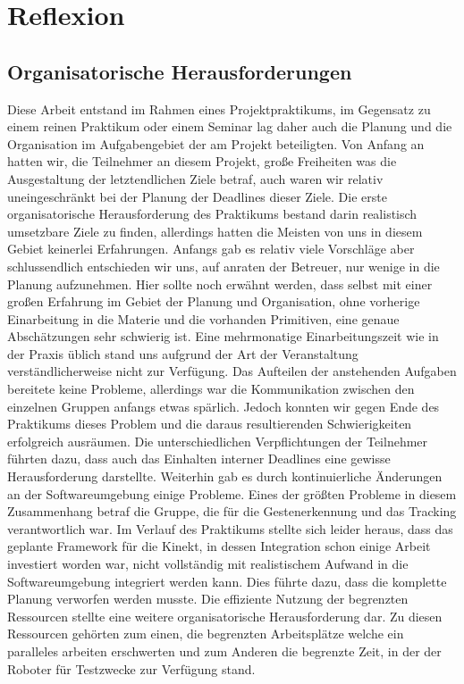 \section{Reflexion}
\authorsection{\editorandreas}
\subsection{Organisatorische Herausforderungen}
Diese Arbeit entstand im Rahmen eines Projektpraktikums, im Gegensatz
 zu einem reinen Praktikum oder einem Seminar lag daher auch
 die Planung und die Organisation im Aufgabengebiet der am Projekt
 beteiligten. Von Anfang an hatten wir, die Teilnehmer an diesem
 Projekt, große Freiheiten was die Ausgestaltung der letztendlichen
 Ziele betraf, auch waren wir relativ uneingeschränkt bei der Planung
 der Deadlines dieser Ziele. Die erste organisatorische
 Herausforderung des Praktikums bestand darin realistisch umsetzbare
 Ziele zu finden, allerdings hatten die Meisten von uns in diesem
 Gebiet keinerlei Erfahrungen. Anfangs gab es relativ viele Vorschläge
 aber schlussendlich entschieden wir uns, auf anraten der Betreuer,
 nur wenige in die Planung aufzunehmen. Hier sollte noch erwähnt
 werden, dass selbst mit einer großen Erfahrung im Gebiet der
 Planung und Organisation, ohne vorherige Einarbeitung in die Materie
 und die vorhanden Primitiven, eine genaue Abschätzungen sehr
 schwierig ist. Eine mehrmonatige Einarbeitungszeit wie in der Praxis
 üblich stand uns aufgrund der Art der Veranstaltung
 verständlicherweise nicht zur Verfügung.
 Das Aufteilen der anstehenden Aufgaben bereitete keine Probleme,
 allerdings war die Kommunikation zwischen den einzelnen Gruppen
 anfangs etwas spärlich. Jedoch konnten wir gegen Ende des
 Praktikums dieses Problem und die daraus resultierenden
 Schwierigkeiten erfolgreich ausräumen. Die unterschiedlichen
 Verpflichtungen der Teilnehmer führten dazu, dass auch das
 Einhalten interner Deadlines eine gewisse Herausforderung
 darstellte. Weiterhin gab es durch kontinuierliche Änderungen
 an der Softwareumgebung einige Probleme. Eines der größten Probleme
 in diesem Zusammenhang betraf die Gruppe, die für die
 Gestenerkennung und das Tracking verantwortlich war.
 Im Verlauf des Praktikums stellte sich leider heraus,
 dass das geplante Framework für die Kinekt, in dessen Integration
 schon einige Arbeit investiert worden war, nicht vollständig
 mit realistischem Aufwand in die Softwareumgebung integriert werden
 kann. Dies führte dazu, dass die komplette Planung verworfen
 werden musste. Die effiziente Nutzung der begrenzten Ressourcen
 stellte eine weitere organisatorische Herausforderung dar.
 Zu diesen Ressourcen gehörten zum einen, die begrenzten Arbeitsplätze
 welche ein paralleles arbeiten erschwerten und zum Anderen die
 begrenzte Zeit, in der der Roboter für Testzwecke zur Verfügung
 stand.
